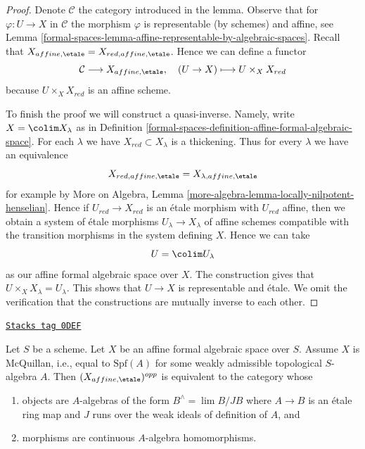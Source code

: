 \begin{proof}
Denote $\mathcal{C}$ the category introduced in the lemma.
Observe that for $\varphi : U \to X$ in $\mathcal{C}$ the
morphism $\varphi$ is representable (by schemes) and affine, see
Lemma \ref{formal-spaces-lemma-affine-representable-by-algebraic-spaces}.
Recall that $X_{affine, \etale} = X_{red, affine, \etale}$.
Hence we can define a functor
$$
\mathcal{C} \longrightarrow X_{affine, \etale},\quad
(U \to X) \longmapsto U \times_X X_{red}
$$
because $U \times_X X_{red}$ is an affine scheme.

\medskip\noindent
To finish the proof we will construct a quasi-inverse.
Namely, write $X = \colim X_\lambda$ as in
Definition \ref{formal-spaces-definition-affine-formal-algebraic-space}.
For each $\lambda$ we have $X_{red} \subset X_\lambda$
is a thickening. Thus for every $\lambda$ we have an
equivalence
$$
X_{red, affine, \etale} = X_{\lambda, affine, \etale}
$$
for example by
More on Algebra, Lemma \ref{more-algebra-lemma-locally-nilpotent-henselian}.
Hence if $U_{red} \to X_{red}$ is an \'etale morphism with
$U_{red}$ affine, then we obtain a system of \'etale morphisms
$U_\lambda \to X_\lambda$ of affine schemes compatible with the
transition morphisms in the system defining $X$. Hence we can take
$$
U = \colim U_\lambda
$$
as our affine formal algebraic space over $X$. The construction gives that
$U \times_X X_\lambda = U_\lambda$. This shows that $U \to X$ is
representable and \'etale. We omit the verification that the constructions
are mutually inverse to each other.
\end{proof}

\begin{lemma}
\label{formal-spaces-lemma-affine-etale-mcquillan}
\href{https://stacks.math.columbia.edu/tag/0DEF}{\texttt{Stacks tag 0DEF}}

Let $S$ be a scheme. Let $X$ be an affine formal
algebraic space over $S$. Assume $X$ is McQuillan, i.e.,
equal to $\text{Spf}(A)$ for some
weakly admissible topological $S$-algebra $A$.
Then $(X_{affine, \etale})^{opp}$ is equivalent to
the category whose
\begin{enumerate}
\item objects are $A$-algebras of the form
$B^\wedge = \lim B/JB$ where $A \to B$ is an \'etale ring map
and $J$ runs over the weak ideals of definition of $A$, and
\item morphisms are continuous $A$-algebra homomorphisms.
\end{enumerate}
\end{lemma}

